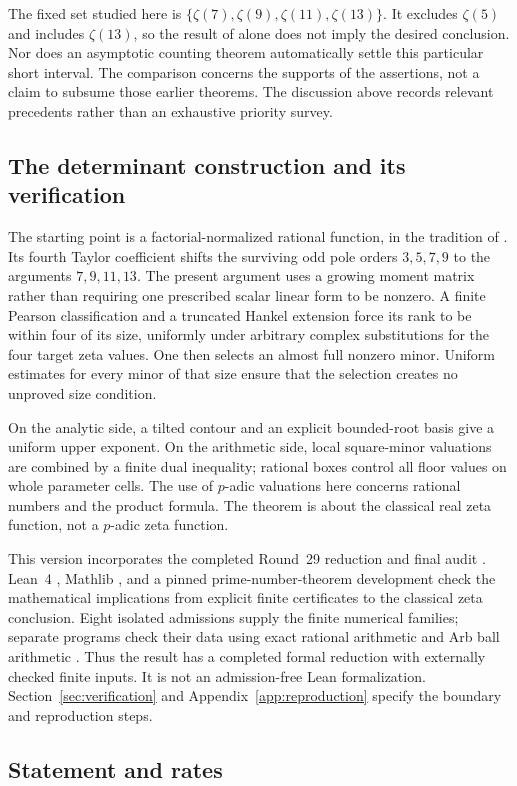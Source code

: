 The fixed set studied here is $\{\zeta(7),\zeta(9),\zeta(11),\zeta(13)\}$.
It excludes $\zeta(5)$ and includes $\zeta(13)$, so the result of
\cite{Zudilin01} alone does not imply the desired conclusion. Nor does an
asymptotic counting theorem automatically settle this particular short
interval. The comparison concerns the supports of the assertions, not a
claim to subsume those earlier theorems. The discussion above records relevant precedents rather than an
exhaustive priority survey.

\subsection{The determinant construction and its verification}
The starting point is a factorial-normalized rational function, in the
tradition of \cite{BR,Zudilin04}. Its fourth Taylor coefficient shifts the
surviving odd pole orders $3,5,7,9$ to the arguments $7,9,11,13$.
The present argument uses a growing moment matrix rather than requiring
one prescribed scalar linear form to be nonzero. A finite Pearson
classification and a truncated Hankel extension force its rank to be
within four of its size, uniformly under arbitrary complex substitutions
for the four target zeta values. One then selects an almost full nonzero
minor. Uniform estimates for every minor of that size ensure that the
selection creates no unproved size condition.

On the analytic side, a tilted contour and an explicit bounded-root basis
give a uniform upper exponent. On the arithmetic side, local square-minor
valuations are combined by a finite dual inequality; rational boxes control
all floor values on whole parameter cells. The use of $p$-adic valuations
here concerns rational numbers and the product formula. The theorem is
about the classical real zeta function, not a $p$-adic zeta function.

This version incorporates the completed Round~29 reduction and final audit
\cite{Project}. Lean~4 \cite{Lean4}, Mathlib \cite{Mathlib}, and a pinned
prime-number-theorem development \cite{PNT} check the mathematical
implications from explicit finite certificates to the classical zeta
conclusion. Eight isolated admissions supply the finite numerical families;
separate programs check their data using exact rational arithmetic and Arb
ball arithmetic \cite{Arb}. Thus the result has a completed formal reduction
with externally checked finite inputs. It is not an admission-free Lean
formalization. Section~\ref{sec:verification} and
Appendix~\ref{app:reproduction} specify the boundary and reproduction steps.

\subsection{Statement and rates}
